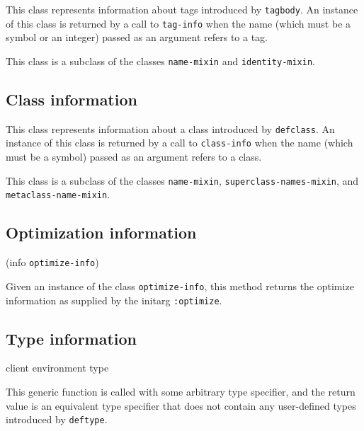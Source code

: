 
This class represents information about tags introduced by
\texttt{tagbody}.  An instance of this class is returned by a call to
\texttt{tag-info} when the name (which must be a symbol or an integer)
passed as an argument refers to a tag.

This class is a subclass of the classes \texttt{name-mixin} and
\texttt{identity-mixin}.

\subsection{Class information}


This class represents information about a class introduced by
\texttt{defclass}.  An instance of this class is returned by a call to
\texttt{class-info} when the name (which must be a symbol)
passed as an argument refers to a class.

This class is a subclass of the classes \texttt{name-mixin},
\texttt{superclass-names-mixin},  and
\texttt{metaclass-name-mixin}.

\subsection{Optimization information}


 {(info {\tt optimize-info})}

Given an instance of the class \texttt{optimize-info}, this method
returns the optimize information as supplied by the initarg
\texttt{:optimize}.

\subsection{Type information}

 {client environment type}

This generic function is called with some arbitrary type specifier,
and the return value is an equivalent type specifier that does not
contain any user-defined types introduced by \texttt{deftype}.

